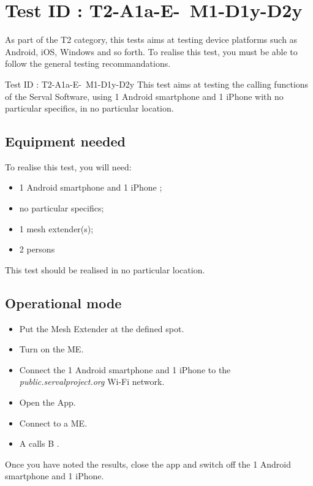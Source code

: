 \documentclass[oneside]{book}
\begin{document}
\section{Test ID : T2-A1a-E- M1-D1y-D2y}
\begin{itshape}
As part of the T2 category, this tests aims at testing device platforms such as Android, iOS, Windows and so forth.
To realise this test, you must be able to follow the general testing recommandations.
\end{itshape}
\newline
Test ID : T2-A1a-E- M1-D1y-D2y
 This test aims at testing the calling functions of the Serval Software, using 1 Android smartphone and 1 iPhone with no particular specifics, in no particular location.
\subsection{Equipment needed} To realise this test, you will need:
\begin{itemize}
\item 1 Android smartphone and 1 iPhone ;
\item no particular specifics;
\item 1 mesh extender(s);
\item 2 persons
\end{itemize}
This test should be realised in no particular location.
\subsection{Operational mode} \begin{itemize}
\item Put the Mesh Extender at the defined spot.
\item Turn on the ME.
\item Connect the 1 Android smartphone and 1 iPhone to the \emph{public.servalproject.org} Wi-Fi network.
\item Open the App.
\item Connect to a ME.
\item A calls B .
\end{itemize}
Once you have noted the results, close the app and switch off the 1 Android smartphone and 1 iPhone.
\end{document}
